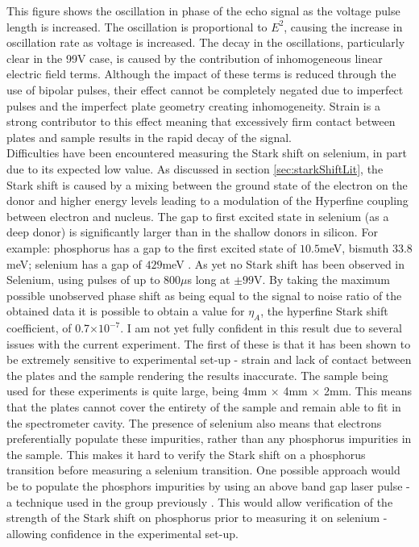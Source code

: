 This figure shows the oscillation in phase of the echo signal as the voltage pulse length is increased.
The oscillation is proportional to $E^2$, causing the increase in oscillation rate as voltage is increased.
The decay in the oscillations, particularly clear in the 99V case, is caused by the contribution of inhomogeneous linear electric field terms.
Although the impact of these terms is reduced through the use of bipolar pulses, their effect cannot be completely negated due to imperfect pulses and the imperfect plate geometry creating inhomogeneity. 
Strain is a strong contributor to this effect meaning that excessively firm contact between plates and sample results in the rapid decay of the signal.
\\
Difficulties have been encountered measuring the Stark shift on selenium, in part due to its expected low value.
As discussed in section \ref{sec:starkShiftLit}, the Stark shift is caused by a mixing between the ground state of the electron on the donor and higher energy levels leading to a modulation of the Hyperfine coupling between electron and nucleus.
The gap to first excited state in selenium (as a deep donor) is significantly larger than in the shallow donors in silicon. 
For example: phosphorus has a gap to the first excited state of $10.5$meV, bismuth $33.8$meV; selenium has a gap of $429$meV \cite{LoNardo2015,Nardo2015}. 
As yet no Stark shift has been observed in Selenium, using pulses of up to 800$\mu$s long at $\pm99$V.
By taking the maximum possible unobserved phase shift as being equal to the signal to noise ratio of the obtained data it is possible to obtain a value for $\eta_A$, the hyperfine Stark shift coefficient, of 0.7$\times10^{-7}$.
I am not yet fully confident in this result due to several issues with the current experiment.
The first of these is that it has been shown to be extremely sensitive to experimental set-up - strain and lack of contact between the plates and the sample rendering the results inaccurate.
The sample being used for these experiments is quite large, being 4mm $\times$ 4mm $\times$ 2mm.
This means that the plates cannot cover the entirety of the sample and remain able to fit in the spectrometer cavity.
The presence of selenium also means that electrons preferentially populate these impurities, rather than any phosphorus impurities in the sample.
This makes it hard to verify the Stark shift on a phosphorus transition before measuring a selenium transition.
One possible approach would be to populate the phosphors impurities by using an above band gap laser pulse - a technique used in the group previously \cite{Nardo2015}.
This would allow verification of the strength of the Stark shift on phosphorus prior to measuring it on selenium - allowing confidence in the experimental set-up.

